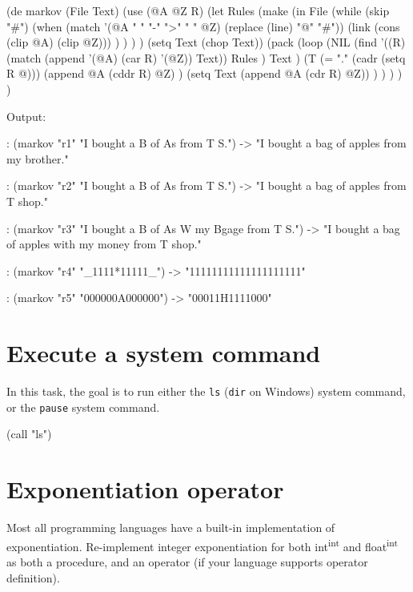 \begin{wideverbatim}

(de markov (File Text)
   (use (@A @Z R)
      (let Rules
         (make
            (in File
               (while (skip "#")
                  (when (match '(@A " " "-" ">" " " @Z) (replace (line) "@" "#"))
                     (link (cons (clip @A) (clip @Z))) ) ) ) )
         (setq Text (chop Text))
         (pack
            (loop
               (NIL
                  (find
                     '((R) (match (append '(@A) (car R) '(@Z)) Text))
                     Rules )
                  Text )
               (T (= "." (cadr (setq R @)))
                  (append @A (cddr R) @Z) )
               (setq Text (append @A (cdr R) @Z)) ) ) ) ) )

Output:

: (markov "r1" "I bought a B of As from T S.")
-> "I bought a bag of apples from my brother."

: (markov "r2" "I bought a B of As from T S.")
-> "I bought a bag of apples from T shop."

: (markov "r3" "I bought a B of As W my Bgage from T S.")
-> "I bought a bag of apples with my money from T shop."

: (markov "r4" "_1111*11111_")
-> "11111111111111111111"

: (markov "r5" "000000A000000")
-> "00011H1111000"

\end{wideverbatim}

\pagebreak{}
\section*{Execute a system command}

In this task, the goal is to run either the \texttt{ls} (\texttt{dir} on
Windows) system command, or the \texttt{pause} system command.

\begin{wideverbatim}

(call "ls")

\end{wideverbatim}

\pagebreak{}
\section*{Exponentiation operator}

Most all programming languages have a built-in implementation of
exponentiation. Re-implement integer exponentiation for both
int\textsuperscript{int} and float\textsuperscript{int} as both a
procedure, and an operator (if your language supports operator
definition).

